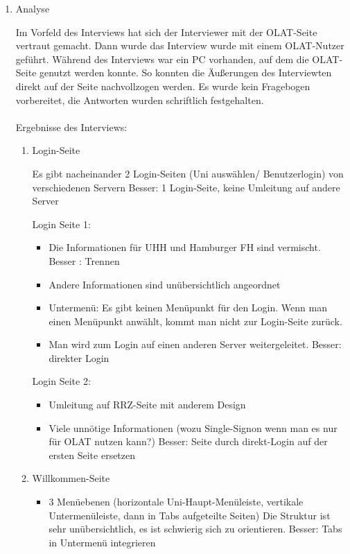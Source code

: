 \documentclass[a4paper,10pt]{article}
\begin{document}
\kopf
\renewcommand{\figurename}{Figure}

\begin{enumerate}
\item Analyse

Im Vorfeld des Interviews hat sich der Interviewer mit der OLAT-Seite vertraut gemacht.
Dann wurde das Interview wurde mit einem OLAT-Nutzer geführt. Während des Interviews war ein PC vorhanden, auf dem die OLAT-Seite genutzt werden konnte. So konnten die Äußerungen des Interviewten direkt auf der Seite nachvollzogen werden.
Es wurde kein Fragebogen vorbereitet, die Antworten wurden schriftlich festgehalten.
\\ \\
Ergebnisse des Interviews:
\begin{enumerate}
\item{Login-Seite}

Es gibt nacheinander 2 Login-Seiten (Uni auswählen/ Benutzerlogin) von verschiedenen Servern Besser: 1 Login-Seite, keine Umleitung auf andere Server

Login Seite 1:
\begin{itemize}
\item Die Informationen für UHH und Hamburger FH sind vermischt. Besser : Trennen
\item Andere Informationen sind unübersichtlich angeordnet
\item Untermenü: Es gibt keinen Menüpunkt für den Login. Wenn man einen Menüpunkt anwählt, kommt man nicht zur Login-Seite zurück.
\item Man wird zum Login auf einen anderen Server weitergeleitet. Besser: direkter Login
\end{itemize}

Login Seite 2:
\begin{itemize}
\item Umleitung auf RRZ-Seite mit anderem Design
\item Viele unnötige Informationen (wozu Single-Signon wenn man es nur für OLAT nutzen kann?)
Besser: Seite durch direkt-Login auf der ersten Seite ersetzen
\end{itemize}


\item{Willkommen-Seite}
\begin{itemize}
\item 3 Menüebenen (horizontale Uni-Haupt-Menüleiste, vertikale Untermenüleiste, dann in Tabs aufgeteilte Seiten)
 Die Struktur ist sehr unübersichtlich, es ist schwierig sich zu orientieren. Besser: Tabs in Untermenü integrieren


\end{itemize}
\end{enumerate}
\end{enumerate}
\end{document}
